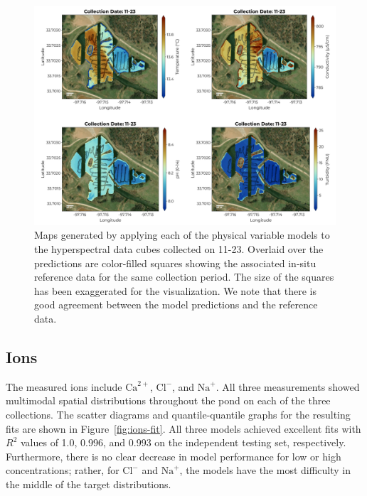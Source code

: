 \documentclass[remotesensing,article,submit,pdftex,moreauthors]{Definitions/mdpi}
\begin{document}
\begin{figure}[t!]
\centering
\vspace{-0.3in}
\includegraphics[width=0.9\columnwidth]{paper/figures/results/maps/physical.pdf}
\vspace{-0.2in}
\caption{Maps generated by applying each of the physical variable models to the hyperspectral data cubes collected on 11-23. Overlaid over the predictions are color-filled squares showing the associated in-situ reference data for the same collection period. The size of the squares has been exaggerated for the visualization. We note that there is good agreement between the model predictions and the reference data. \label{fig:map-physical}}
\end{figure}  

\pagebreak

\subsection{Ions}

The measured ions include $\mathrm{Ca}^{2+}$, $\mathrm{Cl}^{-}$, and $\mathrm{Na}^{+}$. All three measurements showed multimodal spatial distributions throughout the pond on each of the three collections. The scatter diagrams and quantile-quantile graphs for the resulting fits are shown in Figure~\ref{fig:ions-fit}. All three models achieved excellent fits with $R^2$ values of 1.0, 0.996, and 0.993 on the independent testing set, respectively. Furthermore, there is no clear decrease in model performance for low or high concentrations; rather, for $\textrm{Cl}^{-}$ and $\textrm{Na}^{+}$, the models have the most difficulty in the middle of the target distributions. 
\end{document}
